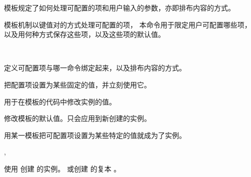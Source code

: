 \documentclass{cusdoc}
\begin{document}
模板规定了如何处理可配置的项和用户输入的参数，亦即排布内容的方式。
\begin{function}[module=lttemplates]{\DeclareTemplateInterface}
  \begin{syntax}
    \V\DeclareTemplateInterface {}   
  \end{syntax}
\LaTeXe 模板机制以键值对的方式处理可配置的项，
本命令用于限定用户可配置哪些项，以及用何种方式保存这些项，以及这些项的默认值。
\end{function}

\begin{function}[module=lttemplates]{\DeclareTemplateCode}
  \begin{syntax}
    \V\DeclareTemplateCode {}  
    ~~ 
  \end{syntax}
定义可配置项与哪一命令绑定起来，以及排布内容的方式。
\end{function}

\begin{function}[module=lttemplates]{\UseTemplate}
  \begin{syntax}
    \V\UseTemplate {}   
  \end{syntax}
把配置项设置为某些固定的值，并立刻使用它。
\end{function}

\begin{function}[module=lttemplates]{\SetTemplateKeys}
  \begin{syntax}
    \V\SetTemplateKeys {}  
  \end{syntax}
用于在模板的代码中修改实例的值。
\end{function}

\begin{function}[module=lttemplates]{\EditTemplateDefaults}
  \begin{syntax}
    \V\EditTemplateDefaults {}  
  \end{syntax}
修改模板的默认值。只会应用到新创建的实例。
\end{function}

用某一模板把可配置项设置为某些特定的值就成为了实例。
\begin{function}[module=lttemplates]{\DeclareInstance,\DeclareInstanceCopy}
  \begin{syntax}
    \V\DeclareInstance {}   
    \V\DeclareInstanceCopy {}  
  \end{syntax}
使用  创建  的实例。
或创建  的复本 。
\end{function}
\end{document}
